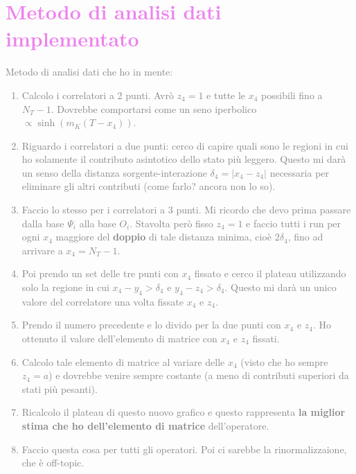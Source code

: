 \documentclass[english, LaM, oneside, noexaminfo]{sapthesis}
\newcommand{\colg}{\textcolor{gray}}
\newcommand{\colv}{\textcolor{violet}}
\begin{document}
\section{\colv{Metodo di analisi dati implementato}}
\noindent
\colg{
    Metodo di analisi dati che ho in mente:
    \begin{enumerate}
        \item Calcolo i correlatori a 2 punti.
            Avrò $z_4 = 1$ e tutte le $x_4$ possibili fino a $N_T-1$.
            Dovrebbe comportarsi come un seno iperbolico $\propto \sinh\left(m_K (T-x_4)\right)$.
        \item Riguardo i correlatori a due punti: cerco di capire quali sono le regioni in cui ho solamente il contributo asintotico dello stato più leggero.
            Questo mi darà un senso della distanza sorgente-interazione $\delta_4 = |x_4-z_4|$ necessaria per eliminare gli altri contributi (come farlo? ancora non lo so).
        \item Faccio lo stesso per i correlatori a 3 punti.
            Mi ricordo che devo prima passare dalla base $\Psi_i$ alla base $O_i$.
            Stavolta però fisso $z_4 = 1$ e faccio tutti i run per ogni $x_4$ maggiore del {\bf doppio} di tale distanza minima, cioè $2\delta_4$, fino ad arrivare a $x_4 = N_T -1$.
        \item Poi prendo un set delle tre punti con $x_4$ fissato e cerco il plateau utilizzando solo la regione in cui $x_4 - y_4 > \delta_4$ e $y_4-z_4 > \delta_4$. Questo mi darà un unico valore del correlatore una volta fissate $x_4$ e $z_4$.
        \item Prendo il numero precedente e lo divido per la due punti con $x_4$ e $z_4$. Ho ottenuto il valore dell'elemento di matrice con $x_4$ e $z_4$ fissati.
        \item Calcolo tale elemento di matrice al variare delle $x_4$ (visto che ho sempre $z_4=a$) e dovrebbe venire sempre costante (a meno di contributi superiori da stati più pesanti).
        \item Ricalcolo il plateau di questo nuovo grafico e questo rappresenta {\bf la miglior stima che ho dell'elemento di matrice} dell'operatore.
        \item Faccio questa cosa per tutti gli operatori. Poi ci sarebbe la rinormalizzaione, che è off-topic.
    \end{enumerate}
}


\appendix %
\end{document}

